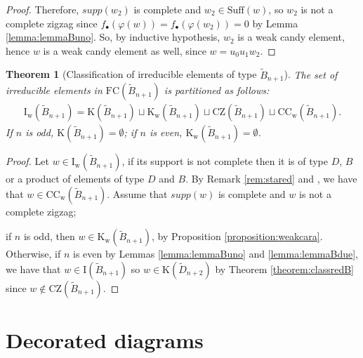 \documentclass{amsart}
\newcommand{\D}{{\widetilde{D}_{n+2}}}
\newcommand{\B}{{\widetilde{B}_{n+1}}}
\newcommand{\fc}{{\mathrm{FC}}}
\newcommand{\su}{\mathrm{Suff}}
\newcommand{\TTCw}{\mathrm{CC_w}}
\newcommand{\zz}{\mathrm{CZ}}
\newcommand{\car}{\mathrm{K}}
\newcommand{\carw}{\mathrm{K_w}}
\newcommand{\IR}{\mathrm{I_w}}
\newcommand{\I}{\mathrm{I}}
\newcommand{\nmap}{\varphi}
\newtheorem{Theorem}{Theorem}[section]
\theoremstyle{definition}
\begin{document}
\begin{proof}
Therefore, $supp(w_2)$ is complete and $w_2\in \su(w)$, so $w_2$ is not a complete zigzag since $f_\bullet(\nmap(w))=f_\bullet(\nmap(w_2))=0$ by Lemma \ref{lemma:lemmaBuno}. So, by inductive hypothesis, $w_2$ is a weak candy element, hence $w$ is a weak candy element as well, since $w=u_0u_1w_2$. 

\end{proof}

\begin{Theorem}[Classification of irreducible elements of type $\B$]
\label{undicesimo}
\noindent
The set of irreducible elements in $\fc(\B)$ is partitioned as follows:
\begin{align*}
    \IR(\B) = \car (\B) \sqcup \carw(\B)\sqcup \zz(\B) \sqcup \TTCw(\B).
\end{align*}
If $n$ is odd, $\car(\B)=\emptyset$; if $n$ is even, $\carw(\B)=\emptyset$.
\end{Theorem}


\begin{proof}
Let $w\in \IR(\B)$, if its support is not complete then it is of type $D$, $B$ or a product of elements of type $D$ and $B$. 
By Remark \ref{rem:stared} and \cite[Theorem 4.2.1]{ernst}, we have that $w\in \TTCw(\B)$. Assume that $supp(w)$ is complete and $w$ is not a complete zigzag; 

if $n$ is odd, then $w\in \carw(\B)$, by Proposition \ref{proposition:weakcara}.
Otherwise, if $n$ is even by Lemmas \ref{lemma:lemmaBuno} and \ref{lemma:lemmaBdue}, we have that $w\in \I(\B)$ so $w\in \car(\D)$ by Theorem \ref{theorem:classredB} since $w\notin \zz(\B)$. 
\end{proof}


\section{Decorated diagrams}\label{sec:diagrams}


\end{document}
